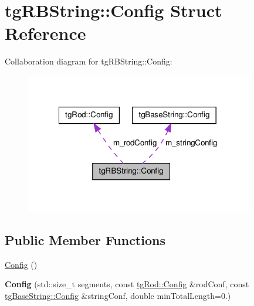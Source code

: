 \hypertarget{structtg_r_b_string_1_1_config}{\section{tg\-R\-B\-String\-:\-:Config Struct Reference}
\label{structtg_r_b_string_1_1_config}
}


Collaboration diagram for tg\-R\-B\-String\-:\-:Config\-:\nopagebreak
\begin{figure}[H]
\begin{center}
\leavevmode
\includegraphics[width=283pt]{structtg_r_b_string_1_1_config__coll__graph}
\end{center}
\end{figure}
\subsection*{Public Member Functions}
\begin{DoxyCompactItemize}
\item 
\hyperlink{structtg_r_b_string_1_1_config_a599e7c66d595cbb500ad71722660d092}{Config} ()
\item 
\hypertarget{structtg_r_b_string_1_1_config_a61dd326c15917436840d364556763fb8}{{\bfseries Config} (std\-::size\-\_\-t segments, const \hyperlink{structtg_rod_1_1_config}{tg\-Rod\-::\-Config} \&rod\-Conf, const \hyperlink{structtg_base_string_1_1_config}{tg\-Base\-String\-::\-Config} \&string\-Conf, double min\-Total\-Length=0.)}\label{structtg_r_b_string_1_1_config_a61dd326c15917436840d364556763fb8}

\end{DoxyCompactItemize}
